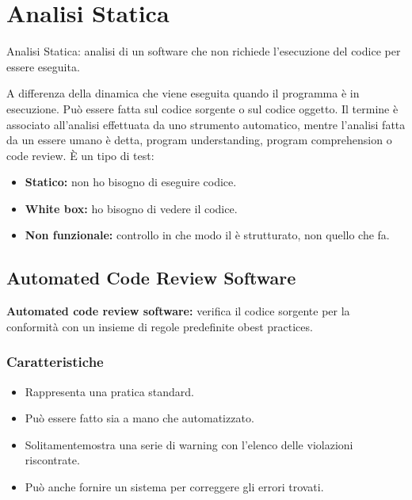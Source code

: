 \section{Analisi Statica}
\begin{mdframed}
    Analisi Statica: analisi di un software che non richiede l'esecuzione del codice per essere eseguita.
\end{mdframed}
A differenza della dinamica che viene eseguita quando il programma è in esecuzione.
Può essere fatta sul codice sorgente o sul codice oggetto.
Il termine è associato all'analisi effettuata da uno strumento automatico, mentre l'analisi fatta da un essere umano è detta, program understanding, program comprehension o code review.
È un tipo di test:
\begin{itemize}
    \item \textbf{Statico:} non ho bisogno di eseguire codice.
    \item \textbf{White box:} ho bisogno di vedere il codice.
    \item \textbf{Non funzionale:} controllo in che modo il è strutturato, non quello che fa.
\end{itemize}

\subsection{Automated Code Review Software}
\begin{mdframed}
    \textbf{Automated code review software:} verifica il codice sorgente per la conformità con un insieme di regole predefinite obest practices.
\end{mdframed}

\subsubsection{Caratteristiche}
\begin{itemize}
    \item Rappresenta una pratica standard.
    \item Può essere fatto sia a mano che automatizzato.
    \item Solitamentemostra una serie di warning con l'elenco delle violazioni riscontrate.
    \item Può anche fornire un sistema per correggere gli errori trovati.
\end{itemize}

